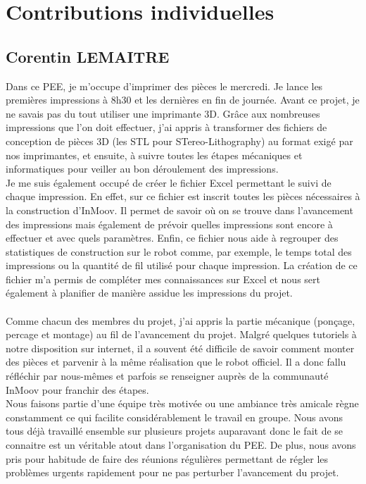\documentclass[11pt, oneside]{article}
\begin{document}
\section{Contributions individuelles}
\subsection{Corentin LEMAITRE}
\vspace{0.5cm}

Dans ce PEE, je m’occupe d’imprimer des pièces le mercredi. Je lance les premières impressions à 8h30 et les dernières en fin de journée. Avant ce projet, je ne savais pas du tout utiliser une imprimante 3D. Grâce aux nombreuses impressions que l'on doit effectuer, j'ai appris à transformer des fichiers de conception de pièces 3D (les STL pour STereo-Lithography)  au format exigé par nos imprimantes, et ensuite, à suivre toutes les étapes mécaniques et informatiques pour veiller au bon déroulement des impressions.\\
Je me suis également occupé de créer le fichier Excel permettant le suivi de chaque impression. En effet, sur ce fichier est inscrit toutes les pièces nécessaires à la construction d'InMoov. Il permet de savoir où on se trouve dans l'avancement des impressions mais également de prévoir quelles impressions sont encore à effectuer et avec quels paramètres. Enfin, ce fichier nous aide à regrouper des statistiques de construction sur le robot comme, par exemple, le temps total des impressions ou la quantité de fil utilisé pour chaque impression. La création de ce fichier m'a permis de compléter mes connaissances sur Excel et nous sert également à planifier de manière assidue les impressions du projet. 
\paragraph{}
Comme chacun des membres du projet, j'ai appris la partie mécanique (ponçage, percage et montage) au fil de l'avancement du projet. Malgré quelques tutoriels à notre disposition sur internet, il a souvent été difficile de savoir comment monter des pièces et parvenir à la même réalisation que le robot officiel. Il a donc fallu réfléchir par nous-mêmes et parfois se renseigner auprès de la communauté InMoov pour franchir des étapes. \\
Nous faisons partie d’une équipe très motivée ou une ambiance très amicale règne constamment ce qui facilite considérablement le travail en groupe. Nous avons tous déjà travaillé ensemble sur plusieurs projets auparavant donc le fait de se connaitre est un véritable atout dans l'organisation du PEE. De plus, nous avons pris pour habitude de faire des réunions régulières permettant de régler les problèmes urgents rapidement pour ne pas perturber l'avancement du projet.
\end{document}
